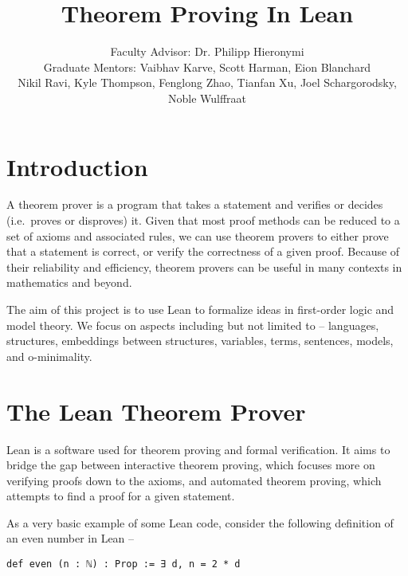 \documentclass[landscape]{sciposter}
\title{\hspace{-5cm}Theorem Proving In Lean}
\author{Faculty Advisor: Dr. Philipp Hieronymi\\Graduate Mentors: Vaibhav Karve, Scott Harman, Eion Blanchard\\
Nikil Ravi, Kyle Thompson, Fenglong Zhao, Tianfan Xu, Joel Schargorodsky, Noble Wulffraat}
\begin{document}

\maketitle
\vspace{-3ex}
\begin{multicols}{3}  %



\section*{Introduction}

A theorem prover is a program that takes a statement and verifies or decides (i.e.\ proves or disproves) it. Given that most proof methods can be reduced to a set of axioms and associated rules, we can use theorem provers to either prove that a statement is correct, or verify the correctness of a given proof. Because of their reliability and efficiency, theorem provers can be useful in many contexts in mathematics and beyond.

The aim of this project is to use Lean to formalize ideas in first-order logic and model theory. We focus on aspects including but not limited to -- languages, structures, embeddings between structures, variables, terms, sentences, models, and o-minimality.

\section*{The Lean Theorem Prover}

Lean is a software used for theorem proving and formal verification. It aims to bridge the gap between interactive theorem proving, which focuses more on verifying proofs down to the axioms, and automated theorem proving, which attempts to find a proof for a given statement.

As a very basic example of some Lean code, consider the following definition of an even number in Lean --
\vspace{4mm}
\begin{lstlisting}
def even (n : ℕ) : Prop := ∃ d, n = 2 * d
\end{lstlisting}


\end{multicols}
\end{document}
